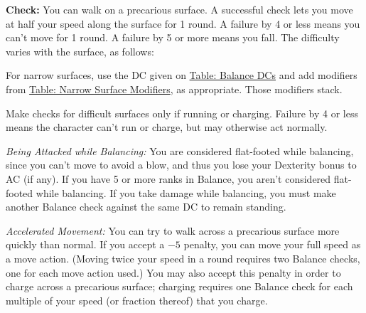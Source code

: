 \textbf{Check:} You can walk on a precarious surface. A successful check lets you move at half your speed along the surface for 1 round. A failure by 4 or less means you can’t move for 1 round. A failure by 5 or more means you fall. The difficulty varies with the surface, as follows:



For narrow surfaces, use the DC given on \hyperref[tab:Balance DCs]{Table: Balance DCs} and add modifiers from \hyperref[tab:Narrow Surface Modifiers]{Table: Narrow Surface Modifiers}, as appropriate. Those modifiers stack.

Make checks for difficult surfaces only if running or charging. Failure by 4 or less means the character can’t run or charge, but may otherwise act normally.

\textit{Being Attacked while Balancing:} You are considered flat-footed while balancing, since you can’t move to avoid a blow, and thus you lose your Dexterity bonus to AC (if any). If you have 5 or more ranks in Balance, you aren’t considered flat-footed while balancing. If you take damage while balancing, you must make another Balance check against the same DC to remain standing.

\textit{Accelerated Movement:} You can try to walk across a precarious surface more quickly than normal. If you accept a $-5$ penalty, you can move your full speed as a move action. (Moving twice your speed in a round requires two Balance checks, one for each move action used.) You may also accept this penalty in order to charge across a precarious surface; charging requires one Balance check for each multiple of your speed (or fraction thereof) that you charge.

